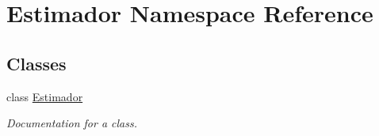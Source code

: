 \hypertarget{namespace_estimador}{}\section{Estimador Namespace Reference}
\label{namespace_estimador}
\subsection*{Classes}
\begin{DoxyCompactItemize}
\item 
class \mbox{\hyperlink{class_estimador_1_1_estimador}{Estimador}}
\begin{DoxyCompactList}\small\item\em Documentation for a class. \end{DoxyCompactList}\end{DoxyCompactItemize}
